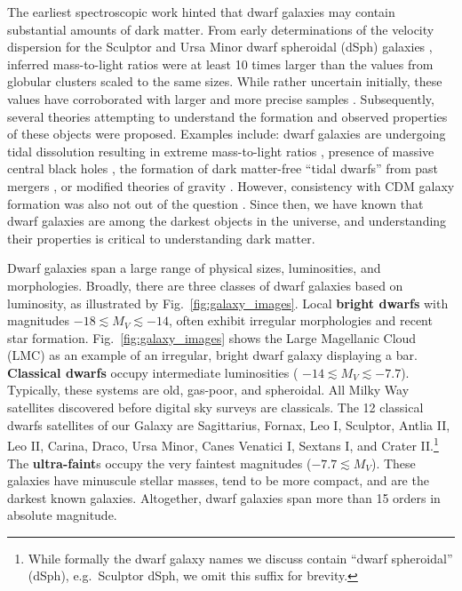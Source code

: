 The earliest spectroscopic work hinted that dwarf galaxies may contain
substantial amounts of dark matter. From early determinations of the
velocity dispersion for the Sculptor and Ursa Minor dwarf spheroidal
(dSph) galaxies
\citep[e.g.,][\citet{aaronson+olszewski1987}]{aaronson1983}, inferred
mass-to-light ratios were at least 10 times larger than the values from
globular clusters scaled to the same sizes. While rather uncertain
initially, these values have corroborated with larger and more precise
samples \citep[e.g.,][]{hargreaves+1994}. Subsequently, several theories
attempting to understand the formation and observed properties of these
objects were proposed. Examples include: dwarf galaxies are undergoing
tidal dissolution resulting in extreme mass-to-light ratios
\citep[e.g.,][]{kuhn+miller1989}, presence of massive central black
holes \citep[e.g.,][]{strobel+lake1994}, the formation of dark
matter-free ``tidal dwarfs'' from past mergers
\citep[e.g.,][\citet{kroupa1997}]{lynden-bell1982}, or modified theories
of gravity \citep{milgrom1995}. However, consistency with CDM galaxy
formation was also not out of the question
\citep[e.g.,][]{dekel+silk1986}. Since then, we have known that dwarf
galaxies are among the darkest objects in the universe, and
understanding their properties is critical to understanding dark matter.

Dwarf galaxies span a large range of physical sizes, luminosities, and
morphologies. Broadly, there are three classes of dwarf galaxies based
on luminosity, as illustrated by Fig.~\ref{fig:galaxy_images}. Local
\textbf{bright dwarfs} with magnitudes
\(-18 \lesssim M_V \lesssim  -14\), often exhibit irregular morphologies
and recent star formation. Fig.~\ref{fig:galaxy_images} shows the Large
Magellanic Cloud (LMC) as an example of an irregular, bright dwarf
galaxy displaying a bar. \textbf{Classical dwarfs} occupy intermediate
luminosities ( \(-14 \lesssim M_V  \lesssim -7.7\)). Typically, these
systems are old, gas-poor, and spheroidal. All Milky Way satellites
discovered before digital sky surveys are classicals. The 12 classical
dwarfs satellites of our Galaxy are Sagittarius, Fornax, Leo I,
Sculptor, Antlia II, Leo II, Carina, Draco, Ursa Minor, Canes Venatici
I, Sextans I, and Crater II.\footnote{While formally the dwarf galaxy
  names we discuss contain ``dwarf spheroidal'' (dSph), e.g.~Sculptor
  dSph, we omit this suffix for brevity.} The \textbf{ultra-faint}s
occupy the very faintest magnitudes (\(-7.7 \lesssim M_V\)). These
galaxies have minuscule stellar masses, tend to be more compact, and are
the darkest known galaxies. Altogether, dwarf galaxies span more than 15
orders in absolute magnitude.

